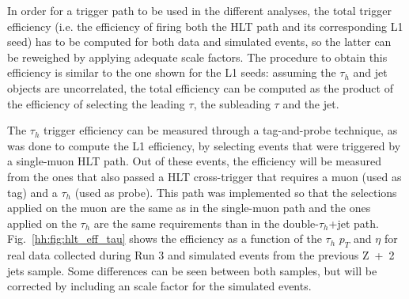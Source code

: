 \documentclass[../main.tex]{subfiles}
\begin{document}
In order for a trigger path to be used in the different analyses, the total trigger efficiency (i.e. the efficiency of firing both the HLT path and its corresponding L1 seed) has to be computed for both data and simulated events, so the latter can be reweighed by applying adequate scale factors. The procedure to obtain this efficiency is similar to the one shown for the L1 seeds: assuming the $\tau_h$ and jet objects are uncorrelated, the total efficiency can be computed as the product of the efficiency of selecting the leading $\tau$, the subleading $\tau$ and the jet.

The $\tau_h$ trigger efficiency can be measured through a tag-and-probe technique, as was done to compute the L1 efficiency, by selecting events that were triggered by a single-muon HLT path. Out of these events, the efficiency will be measured from the ones that also passed a HLT cross-trigger that requires a muon (used as tag) and a $\tau_h$ (used as probe). This path was implemented so that the selections applied on the muon are the same as in the single-muon path and the ones applied on the $\tau_h$ are the same requirements than in the double-$\tau_h$+jet path. Fig.~\ref{hh:fig:hlt_eff_tau} shows the efficiency as a function of the $\tau_h$ $p_T$ and $\eta$ for real data collected during Run 3 and simulated events from the previous Z~+~2 jets sample. 
Some differences can be seen between both samples, but will be corrected by including an scale factor for the simulated events.
\end{document}
